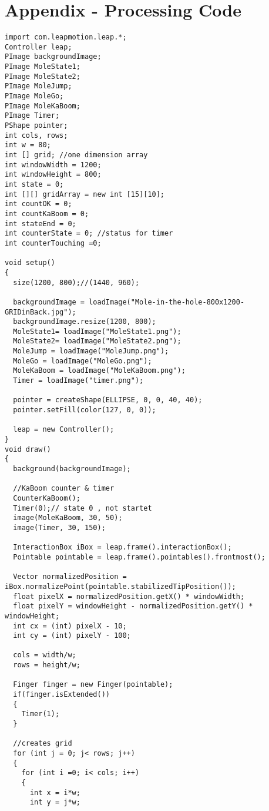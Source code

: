 \chapter{Appendix - Processing Code}

\lstset{language=Java}
\begin{lstlisting}[caption = {}, label={lst:Java}]
import com.leapmotion.leap.*;
Controller leap;
PImage backgroundImage;
PImage MoleState1;
PImage MoleState2;
PImage MoleJump;
PImage MoleGo;
PImage MoleKaBoom;
PImage Timer;
PShape pointer;
int cols, rows;
int w = 80;
int [] grid; //one dimension array
int windowWidth = 1200;
int windowHeight = 800;
int state = 0;
int [][] gridArray = new int [15][10];
int countOK = 0;
int countKaBoom = 0;
int stateEnd = 0;
int counterState = 0; //status for timer
int counterTouching =0;

void setup()
{
  size(1200, 800);//(1440, 960);
  
  backgroundImage = loadImage("Mole-in-the-hole-800x1200-GRIDinBack.jpg");
  backgroundImage.resize(1200, 800);
  MoleState1= loadImage("MoleState1.png");
  MoleState2= loadImage("MoleState2.png");
  MoleJump = loadImage("MoleJump.png");
  MoleGo = loadImage("MoleGo.png");
  MoleKaBoom = loadImage("MoleKaBoom.png");
  Timer = loadImage("timer.png");

  pointer = createShape(ELLIPSE, 0, 0, 40, 40);
  pointer.setFill(color(127, 0, 0));

  leap = new Controller();
}
void draw()
{
  background(backgroundImage);

  //KaBoom counter & timer
  CounterKaBoom();
  Timer(0);// state 0 , not startet
  image(MoleKaBoom, 30, 50);
  image(Timer, 30, 150);

  InteractionBox iBox = leap.frame().interactionBox();
  Pointable pointable = leap.frame().pointables().frontmost();

  Vector normalizedPosition = iBox.normalizePoint(pointable.stabilizedTipPosition());
  float pixelX = normalizedPosition.getX() * windowWidth;
  float pixelY = windowHeight - normalizedPosition.getY() * windowHeight;
  int cx = (int) pixelX - 10;
  int cy = (int) pixelY - 100;

  cols = width/w;
  rows = height/w;
  
  Finger finger = new Finger(pointable);
  if(finger.isExtended())
  {
    Timer(1);
  }
  
  //creates grid
  for (int j = 0; j< rows; j++)
  {
    for (int i =0; i< cols; i++)
    {
      int x = i*w;
      int y = j*w;



\end{lstlisting}
